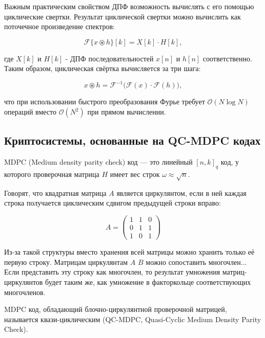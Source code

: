 \documentclass[14pt]{mmcs_article}
\theoremstyle{break}
\begin{document}
Важным практическим свойством ДПФ возможность вычислять с его помощью циклические свертки. Результат циклической свертки можно вычислить как поточечное произведение спектров:

\begin{equation}
    \mathcal{F}\{x \circledast h\}[k] = X[k] \cdot H[k],
\end{equation}

\noindent где $X[k]$ и $H[k]$ \-- ДПФ последовательностей $x[n]$ и $h[n]$
соответственно. Таким образом, циклическая свёртка вычисляется за три шага:

\begin{equation}
    x \circledast h = \mathcal{F}^{-1}\bigl(\mathcal{F}(x) \cdot \mathcal{F}(h)\bigr),
\end{equation}

\noindent что при использовании быстрого преобразования Фурье требует $\mathcal{O}(N \log N)$ операций вместо $\mathcal{O}(N^2)$ при прямом вычислении.

\subsection{Криптосистемы, основанные на QC-MDPC кодах}

MDPC (Medium density parity check) код --- это линейный $[n, k]_q$ код, у которого проверочная матрица $H$ имеет вес строк $\omega \approx \sqrt{n}$.

Говорят, что квадратная матрица $A$ является циркулянтом, если в ней каждая строка получается циклическим сдвигом предыдущей строки вправо:

\begin{equation}
A = \begin{pmatrix}
    1 & 1 & 0 \\
    0 & 1 & 1 \\
    1 & 0 & 1
\end{pmatrix}
\end{equation}

Из-за такой структуры вместо хранения всей матрицы можно хранить только её первую строку. Матрицам циркулянтам $A$ $B$ можно сопоставить многочлен... Если представить эту строку как многочлен, то результат умножения матриц-циркулянтов будет таким же, как умножение в факторкольце соответствующих многочленов.

MDPC код, обладающий блочно-циркулянтной проверочной матрицей, называется квази-циклическим (QC-MDPC, Quasi-Cyclic Medium Density Parity Check).
\end{document}
